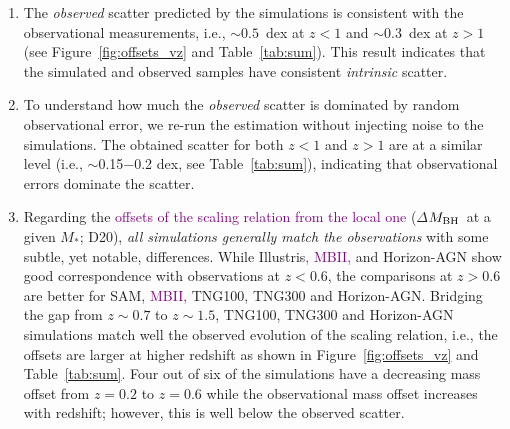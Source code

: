 \documentclass[twocolumn]{aastex631}
\newcommand{\red}[1]{\textcolor{purple}{#1}}
\def\smass{{$M_*$}}
\def\mbh{$M_{\rm BH}$}
\begin{document}
\begin{enumerate}

\item{}The {\it observed} scatter predicted by the simulations is consistent with the observational measurements, i.e., $\sim0.5$~dex at $z<1$ and $\sim0.3$~dex at $z>1$ (see Figure~\ref{fig:offsets_vz} and Table~\ref{tab:sum}). This result indicates that the simulated and observed samples have consistent {\it intrinsic} scatter.

\item{}To understand how much the {\it observed} scatter is dominated by random observational error,
we re-run the estimation without injecting noise to the simulations. The obtained scatter for both $z<1$ and $z>1$ are at a similar level (i.e.,  $\sim$0.15$-$0.2 dex, see Table~\ref{tab:sum}), indicating that observational errors dominate the scatter.

\item{} Regarding the \red{offsets of the scaling relation from the local one} ($\Delta$\mbh\ at a given \smass; D20), {\it all simulations generally match the observations} with some subtle, yet notable, differences. While Illustris\red{, MBII,} and Horizon-AGN show good correspondence with observations at $z<0.6$, the comparisons at $z>0.6$ are better for SAM, \red{MBII,} TNG100, TNG300 and Horizon-AGN. Bridging the gap from \hbox{$z\sim0.7$} to $z\sim1.5$, TNG100, TNG300 and Horizon-AGN simulations match well the observed evolution of the scaling relation, i.e., the offsets are larger at higher redshift as shown in Figure~\ref{fig:offsets_vz} and Table~\ref{tab:sum}. Four out of six of the simulations have a decreasing mass offset from $z=0.2$ to $z=0.6$ while the observational mass offset increases with redshift; however, this is well below the observed scatter.
\end{enumerate}
\end{document}
